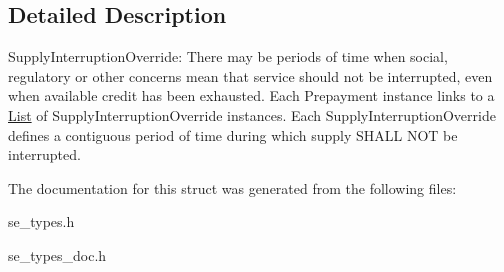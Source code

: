 \subsection{Detailed Description}
Supply\+Interruption\+Override\+: There may be periods of time when social, regulatory or other concerns mean that service should not be interrupted, even when available credit has been exhausted. Each Prepayment instance links to a \hyperlink{structList}{List} of Supply\+Interruption\+Override instances. Each Supply\+Interruption\+Override defines a contiguous period of time during which supply S\+H\+A\+LL N\+OT be interrupted. 

The documentation for this struct was generated from the following files\+:\begin{DoxyCompactItemize}
\item 
se\+\_\+types.\+h\item 
se\+\_\+types\+\_\+doc.\+h\end{DoxyCompactItemize}
